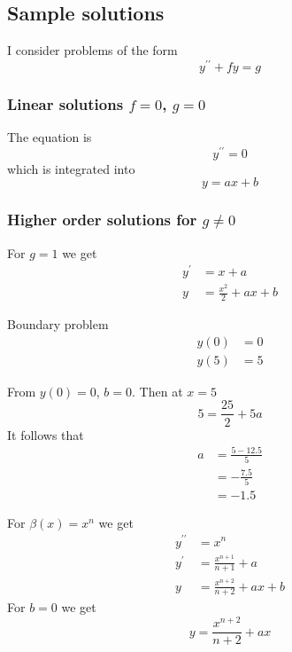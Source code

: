 \documentclass[12pt]{article}%
\begin{document}
\subsection{Sample solutions}

I consider problems of the form%
\begin{equation}
y^{\prime\prime}+fy=g
\end{equation}


\subsubsection{Linear solutions $f=0$, $g=0$}

The equation is%
\begin{equation}
y^{\prime\prime}=0
\end{equation}
which is integrated into%
\begin{equation}
y=ax+b
\end{equation}


\subsubsection{Higher order solutions for $g\neq0$}

For $g=1$ we get%
\begin{align}
y^{\prime}  &  =x+a\\
y  &  =\frac{x^{2}}{2}+ax+b
\end{align}


Boundary problem%
\begin{align}
y\left(  0\right)   &  =0\\
y\left(  5\right)   &  =5
\end{align}


From $y\left(  0\right)  =0$, $b=0$. Then at $x=5$%
\begin{equation}
5=\frac{25}{2}+5a
\end{equation}
It follows that%
\begin{align}
a  &  =\frac{5-12.5}{5}\\
&  =-\frac{7.5}{5}\\
&  =-1.5
\end{align}


For $\beta\left(  x\right)  =x^{n}$ we get%
\begin{align}
y^{\prime\prime}  &  =x^{n}\\
y^{\prime}  &  =\frac{x^{n+1}}{n+1}+a\\
y  &  =\frac{x^{n+2}}{n+2}+ax+b
\end{align}
For $b=0$ we get%
\begin{equation}
y=\frac{x^{n+2}}{n+2}+ax
\end{equation}
\end{document}
